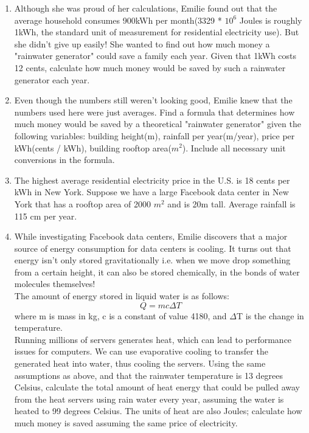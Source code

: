 \documentclass{article}
\begin{document}
\begin{enumerate}
\begin{enumerate}
        \item Although she was proud of her calculations, Emilie found out that the average household consumes 900kWh per  month(3329 * $10^6$ Joules is roughly 1kWh, the standard unit of measurement for residential electricity use). But she didn't give up easily! She wanted to find out how much money a "rainwater generator" could save a family each year. Given that 1kWh costs 12 cents, calculate how much money would be saved by such a rainwater generator each year.
        \item Even though the numbers still weren't looking good, Emilie knew that the numbers used here were just averages. Find a formula that determines how much money would be saved by a theoretical "rainwater generator" given the following variables: building height(m), rainfall per year(m/year), price per kWh(cents / kWh), building rooftop area($m^2$). Include all necessary unit conversions in the formula.
        \item The highest average residential electricity price in the U.S. is 18 cents per kWh in New York. Suppose we have a large Facebook data center in New York that has a rooftop area of 2000 $m^2$ and is 20m tall. Average rainfall is 115 cm per year.
        \item While investigating Facebook data centers, Emilie discovers that a major source of energy consumption for data centers is cooling. It turns out that energy isn't only stored gravitationally i.e. when we move drop something from a certain height, it can also be stored chemically, in the bonds of water molecules themselves!\\
        The amount of energy stored in liquid water is as follows:
        \[ Q = mc \Delta T\]
        where m is mass in kg, c is a constant of value 4180, and $\Delta$T is the change in temperature.\\
        Running millions of servers generates heat, which can lead to performance issues for computers. We can use evaporative cooling to transfer the generated heat into water, thus cooling the servers. Using the same assumptions as above, and that the rainwater temperature is 13 degrees Celsius, calculate the total amount of heat energy that could be pulled away from the heat servers using rain water every year, assuming the water is heated to 99 degrees Celsius. The units of heat are also Joules; calculate how much money is saved assuming the same price of electricity. 
    \end{enumerate}
    


\end{enumerate}
\end{document}
